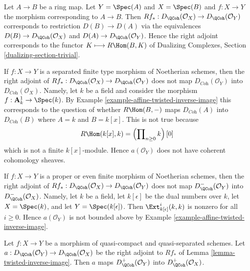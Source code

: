 \begin{example}
\label{example-affine-twisted-inverse-image}
Let $A \to B$ be a ring map. Let $Y = \Spec(A)$ and $X = \Spec(B)$
and $f : X \to Y$ the morphism corresponding to $A \to B$.
Then $Rf_* : D_\QCoh(\mathcal{O}_X) \to D_\QCoh(\mathcal{O}_Y)$
corresponds to restriction $D(B) \to D(A)$ via
the equivalences $D(B) \to D_\QCoh(\mathcal{O}_X)$ and
$D(A) \to D_\QCoh(\mathcal{O}_Y)$. Hence the right adjoint
corresponds to the functor $K \longmapsto R\Hom(B, K)$ of
Dualizing Complexes, Section \ref{dualizing-section-trivial}.
\end{example}

\begin{example}
\label{example-does-not-preserve-coherent}
If $f : X \to Y$ is a separated finite type morphism of Noetherian schemes,
then the right adjoint of
$Rf_* : D_\QCoh(\mathcal{O}_X) \to D_\QCoh(\mathcal{O}_Y)$ does not map
$D_{\textit{Coh}}(\mathcal{O}_Y)$ into
$D_{\textit{Coh}}(\mathcal{O}_X)$. Namely, let $k$ be a field and
consider the morphism $f : \mathbf{A}^1_k \to \Spec(k)$. By
Example \ref{example-affine-twisted-inverse-image}
this corresponds to the question of whether
$R\Hom(B, -)$ maps $D_{\textit{Coh}}(A)$ into $D_{\textit{Coh}}(B)$
where $A = k$ and $B = k[x]$. This is not true because
$$
R\Hom(k[x], k) = \left(\prod\nolimits_{n \geq 0} k\right)[0]
$$
which is not a finite $k[x]$-module. Hence $a(\mathcal{O}_Y)$
does not have coherent cohomology sheaves.
\end{example}

\begin{example}
\label{example-does-not-preserve-bounded-above}
If $f : X \to Y$ is a proper or even finite morphism of Noetherian schemes,
then the right adjoint of
$Rf_* : D_\QCoh(\mathcal{O}_X) \to D_\QCoh(\mathcal{O}_Y)$
does not map $D_\QCoh^-(\mathcal{O}_Y)$ into
$D_\QCoh^-(\mathcal{O}_X)$. Namely, let $k$ be a field, let
$k[\epsilon]$ be the dual numbers over $k$, let
$X = \Spec(k)$, and let $Y = \Spec(k[\epsilon])$.
Then $\Ext^i_{k[\epsilon]}(k, k)$ is nonzero for all $i \geq 0$.
Hence $a(\mathcal{O}_Y)$ is not bounded above
by Example \ref{example-affine-twisted-inverse-image}.
\end{example}

\begin{lemma}
\label{lemma-twisted-inverse-image-bounded-below}
Let $f : X \to Y$ be a morphism of quasi-compact and quasi-separated
schemes. Let $a : D_\QCoh(\mathcal{O}_Y) \to D_\QCoh(\mathcal{O}_X)$
be the right adjoint to $Rf_*$ of Lemma \ref{lemma-twisted-inverse-image}.
Then $a$ maps $D^+_\QCoh(\mathcal{O}_Y)$ into $D^+_\QCoh(\mathcal{O}_X)$.
\end{lemma}


